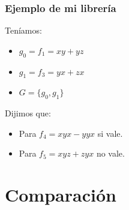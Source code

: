 \documentclass[spanish, aspectratio=169, hidecontrols]{beamer}
\begin{document}
\begin{frame}
  \frametitle{Ejemplo de mi librería}
  \begin{exampleblock}{}
    Teníamos:
    \begin{itemize}
      \item $g_0 = f_1 = xy + yz$
      \item $g_1 = f_3 = yx + zx$
      \item $G = \{g_0, g_1\}$
    \end{itemize}

    Dijimos que:
    \begin{itemize}
      \item Para $f_4 = xyx - yyx$ si vale.
      \item Para $f_5 = xyz + zyx$ no vale.
    \end{itemize}
  \end{exampleblock}
\end{frame}

\section{Comparación}
\end{document}
